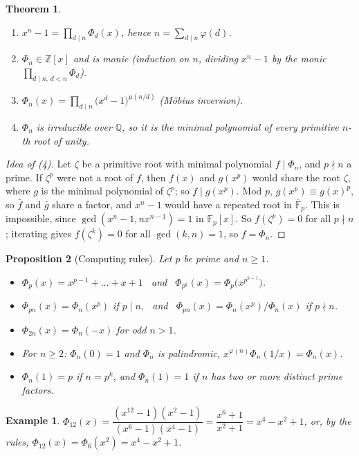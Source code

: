 \documentclass[12pt]{article}
\theoremstyle{breakplain}
\newtheorem{theorem}{Theorem}[section]
\newtheorem{prop}[theorem]{Proposition}
\theoremstyle{breakdef}
\newtheorem*{example}{Example}
\theoremstyle{remark}
\begin{document}
\begin{theorem}
\begin{enumerate}
  \item $x^n-1=\prod_{d\mid n}\Phi_d(x)$, hence $n=\sum_{d\mid n}\varphi(d)$.
  \item $\Phi_n\in\mathbb{Z}[x]$ and is monic (induction on $n$, dividing $x^n-1$ by the monic $\prod_{d\mid n,\,d<n}\Phi_d$).
  \item $\Phi_n(x)=\prod_{d\mid n}\bigl(x^d-1\bigr)^{\mu(n/d)}$ (M\"obius inversion).
  \item $\Phi_n$ is irreducible over $\mathbb{Q}$, so it is the minimal polynomial of every primitive $n$-th root
        of unity.
\end{enumerate}
\end{theorem}
\begin{proof}[Idea of (4)]
Let $\zeta$ be a primitive root with minimal polynomial $f\mid\Phi_n$, and $p\nmid n$ a prime.
If $\zeta^p$ were not a root of $f$, then $f(x)$ and $g(x^p)$ would share the root $\zeta$, where $g$ is
the minimal polynomial of $\zeta^p$; so $f\mid g(x^p)$. Mod $p$, $g(x^p)\equiv g(x)^p$, so $\bar f$ and $\bar g$ share
a factor, and $x^n-1$ would have a repeated root in $\overline{\mathbb{F}}_p$. This is impossible, since
$\gcd(x^n-1,nx^{n-1})=1$ in $\mathbb{F}_p[x]$. So $f(\zeta^p)=0$ for all $p\nmid n$; iterating gives $f(\zeta^k)=0$ for all
$\gcd(k,n)=1$, so $f=\Phi_n$.
\end{proof}
 
\begin{prop}[Computing rules]
Let $p$ be prime and $n\ge1$.
\begin{itemize}
  \item $\Phi_p(x)=x^{p-1}+\dots+x+1$ \ and \ $\Phi_{p^k}(x)=\Phi_p\bigl(x^{p^{k-1}}\bigr)$.
  \item $\Phi_{pn}(x)=\Phi_n(x^p)$ if $p\mid n$, \ and \ $\Phi_{pn}(x)=\Phi_n(x^p)/\Phi_n(x)$ if $p\nmid n$.
  \item $\Phi_{2n}(x)=\Phi_n(-x)$ for odd $n>1$.
  \item For $n\ge2$: $\Phi_n(0)=1$ and $\Phi_n$ is palindromic, $x^{\varphi(n)}\Phi_n(1/x)=\Phi_n(x)$.
  \item $\Phi_n(1)=p$ if $n=p^k$, and $\Phi_n(1)=1$ if $n$ has two or more distinct prime factors.
\end{itemize}
\end{prop}
 
\begin{example}
$\Phi_{12}(x)=\dfrac{(x^{12}-1)(x^2-1)}{(x^6-1)(x^4-1)}=\dfrac{x^6+1}{x^2+1}=x^4-x^2+1$,
or, by the rules, $\Phi_{12}(x)=\Phi_6(x^2)=x^4-x^2+1$.
\end{example}
 
\end{document}

